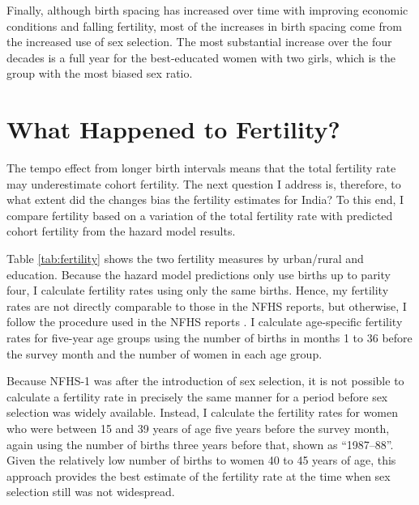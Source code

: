 \documentclass[12pt,letterpaper]{article}
\begin{document}
Finally, although birth spacing has increased over time with improving economic 
conditions and falling fertility, most of the increases in birth spacing come from the
increased use of sex selection. 
The most substantial increase over the four decades is a full year for the best-educated 
women with two girls, which is the group with the most biased sex ratio.



\section{What Happened to Fertility?\label{sec:fertility}}

The tempo effect from longer birth intervals means that the total fertility rate may 
underestimate cohort fertility. 
The next question I address is, therefore, to what extent did the changes bias the 
fertility estimates for India? 
To this end, I compare fertility based on a variation of the total fertility rate with 
predicted cohort fertility from the hazard model results.



Table \ref{tab:fertility} shows the two fertility measures by urban/rural and education.
Because the hazard model predictions only use births up to parity four, I calculate
fertility rates using only the same births.
Hence, my fertility rates are not directly comparable to those in the NFHS reports,
but otherwise, I follow the procedure used in the NFHS reports \citep{Croft2018}.
I calculate age-specific fertility rates for five-year age groups using the number of 
births in months 1 to 36 before the survey month and the number of women in each age 
group.

%

Because NFHS-1 was after the introduction of sex selection, it is not possible 
to calculate a fertility rate in precisely the same manner for a period 
before sex selection was widely available.
Instead, I calculate the fertility rates for women who were between 15 and 39 years of
age five years before the survey month, again using the number of births three years 
before that, shown as ``1987--88''.
Given the relatively low number of births to women 40 to 45 years of age, this approach 
provides the best estimate of the fertility rate at the time when sex selection still was 
not widespread.
\end{document}
